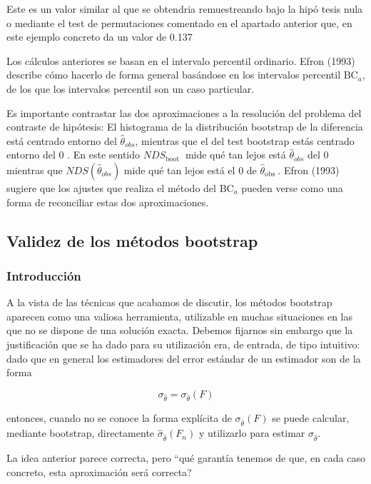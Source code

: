 \documentclass[
]{article}
\begin{document}
Este es un valor similar al que se obtendria remuestreando bajo la hipó tesis nula o mediante el test de permutaciones comentado en el apartado anterior que, en este ejemplo concreto da un valor de 0.137

Los cálculos anteriores se basan en el intervalo percentil ordinario. Efron (1993) describe cómo hacerlo de forma general basándose en los intervalos percentil \(\mathrm{BC}_{a}\), de los que los intervalos percentil son un caso particular.

Es importante contrastar las dos aproximaciones a la resolución del problema del contraste de hipótesis: El histograma de la distribución bootstrap de la diferencia está centrado entorno del \(\hat{\theta}_{o b s}\), mientras que el del test bootstrap estás centrado entorno del 0 . En este sentido \(N D S_{\text {boot }}\) mide qué tan lejos está \(\hat{\theta}_{o b s}\) del 0 mientras que \(N D S\left(\hat{\theta}_{o b s}\right)\) mide qué tan lejos está el 0 de \(\hat{\theta}_{\text {obs }}\). Efron (1993) sugiere que los ajustes que realiza el método del \(\mathrm{BC}_{a}\) pueden verse como una forma de reconciliar estas dos aproximaciones.

\subsection{Validez de los métodos bootstrap}\label{validez-de-los-muxe9todos-bootstrap}

\subsubsection{Introducción}\label{introducciuxf3n-13}

A la vista de las técnicas que acabamos de discutir, los métodos bootstrap aparecen como una valiosa herramienta, utilizable en muchas situaciones en las que no se dispone de una solución exacta. Debemos fijarnos sin embargo que la justificación que se ha dado para su utilización era, de entrada, de tipo intuitivo: dado que en general los estimadores del error estándar de un estimador son de la forma

\[
\sigma_{\hat{\theta}}=\sigma_{\hat{\theta}}(F)
\]

entonces, cuando no se conoce la forma explícita de \(\sigma_{\hat{\theta}}(F)\) se puede calcular, mediante bootstrap, directamente \(\hat{\sigma}_{\hat{\theta}}\left(F_{n}\right)\) y utilizarlo para estimar \(\sigma_{\hat{\theta}}\).

La idea anterior parece correcta, pero ``qué garantía tenemos de que, en cada caso concreto, esta aproximación será correcta?
\end{document}
